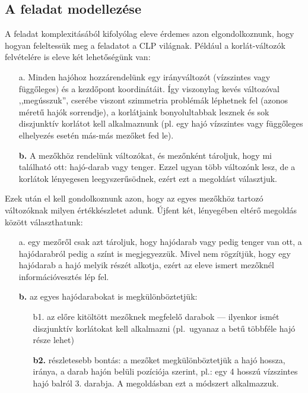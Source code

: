 \subsection{A feladat modellezése}

A feladat komplexitásából kifolyólag eleve érdemes azon elgondolkoznunk, hogy hogyan
feleltessük meg a feladatot a CLP világnak. Például a korlát-változók felvételére
is eleve két lehetőségünk van:

\begin{itemize}
\item[a.] Minden hajóhoz hozzárendelünk egy irányváltozót (vízszintes vagy
függőleges) és a kezdőpont koordinátáit. Így viszonylag kevés változóval
,,megússzuk'', cserébe viszont szimmetria problémák léphetnek fel
(azonos méretű hajók sorrendje), a korlátjaink bonyolultabbak lesznek és
sok diszjunktív korlátot kell alkalmaznunk (pl. egy hajó vízszintes vagy
függőleges elhelyezés esetén más-más mezőket fed le).
\item[{\bf b.}] A mezőkhöz rendelünk változókat, és mezőnként tároljuk, hogy mi
található ott: hajó-darab vagy tenger. Ezzel ugyan több változónk lesz,
de a korlátok lényegesen leegyszerűsödnek, ezért ezt a megoldást választjuk.
\end{itemize}

Ezek után el kell gondolkoznunk azon, hogy az egyes mezőkhöz tartozó változóknak
milyen értékkészletet adunk. Újfent két, lényegében eltérő megoldás között
választhatunk:

\begin{itemize}
\item[a.] egy mezőről csak azt tároljuk, hogy hajódarab vagy pedig tenger van ott,
a hajódarabról pedig a színt is megjegyezzük. Mivel nem rögzítjük, hogy egy hajódarab
a hajó melyik részét alkotja, ezért az eleve ismert mezőknél információvesztés lép fel.
\item[{\bf b.}] az egyes hajódarabokat is megkülönböztetjük:
\begin{itemize}
\item[b1.] az előre kitöltött mezőknek megfelelő darabok  --- ilyenkor
ismét diszjunktív korlátokat kell alkalmazni (pl.\ ugyanaz a betű többféle hajó része
lehet)
\item[{\bf b2.}] részletesebb bontás: a mezőket megkülönböztetjük a hajó hossza, iránya, a
darab hajón belüli pozíciója szerint, pl.: egy 4 hosszú vízszintes hajó balról
3. darabja. A megoldásban ezt a módszert alkalmazzuk.
\end{itemize}
\end{itemize}

